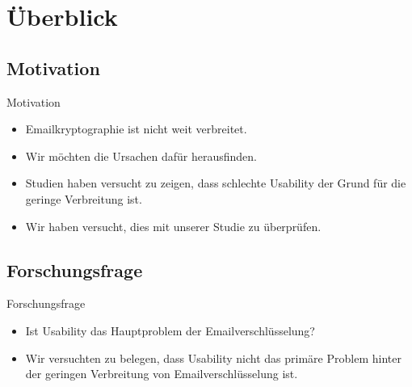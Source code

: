 \documentclass[]{beamer}
\begin{document}
\begin{frame}
	\titlepage
\end{frame}

\begin{frame}
	\tableofcontents
\end{frame}

\section*{Überblick}
\begin{frame}
\end{frame}

\subsection*{Motivation}
\begin{frame}{Motivation}
\begin{itemize}
	\item Emailkryptographie ist nicht weit verbreitet.
	\item Wir möchten die Ursachen dafür herausfinden.
	\item Studien haben versucht zu zeigen, dass schlechte Usability der Grund f\"ur die geringe Verbreitung ist.
	\item Wir haben versucht, dies mit unserer Studie zu überprüfen.
\end{itemize}
\end{frame}


\subsection*{Forschungsfrage}
\begin{frame}{Forschungsfrage}
\begin{itemize}
\item Ist Usability das Hauptproblem der Emailverschl\"usselung?
\item Wir versuchten zu belegen, dass Usability nicht das primäre Problem
		hinter der geringen Verbreitung von Emailverschl\"usselung ist.
\end{itemize}
\end{frame}
\end{document}
